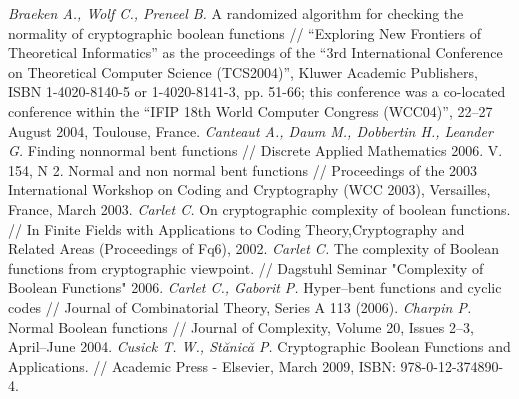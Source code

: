 \begin{thebibliography}{99}
 {\it Braeken A., Wolf C., Preneel B.} A randomized algorithm for checking the normality of cryptographic boolean functions // “Exploring New Frontiers of Theoretical Informatics” as the proceedings of the “3rd International Conference on Theoretical Computer Science (TCS2004)”, Kluwer Academic Publishers, ISBN 1-4020-8140-5 or 1-4020-8141-3, pp. 51-66; this conference was a co-located conference within the “IFIP 18th World Computer Congress (WCC04)”, 22–27 August 2004, Toulouse, France.
 {\it Canteaut A., Daum M., Dobbertin H., Leander G.} Finding nonnormal bent functions // Discrete Applied Mathematics 2006. V. 154, N 2.
 Normal and non normal bent functions // Proceedings of the 2003 International Workshop on Coding and Cryptography (WCC 2003), Versailles, France, March 2003.
 {\it Carlet C.} On cryptographic complexity of boolean functions. // In Finite Fields with Applications to Coding Theory,Cryptography and Related Areas (Proceedings of Fq6), 2002.
 {\it Carlet C.} The complexity of Boolean functions from cryptographic viewpoint. // Dagstuhl Seminar "Complexity of Boolean Functions" 2006.
 {\it Carlet C., Gaborit P.} Hyper–bent functions and cyclic codes // Journal of Combinatorial Theory, Series A 113 (2006).
 {\it Charpin P.} Normal Boolean functions // Journal of Complexity, Volume 20, Issues 2–3, April–June 2004.
 {\it Cusick T. W., Stănică P.} Cryptographic Boolean Functions and Applications. // Academic Press - Elsevier, March 2009, ISBN: 978-0-12-374890-4.

\end{thebibliography}
